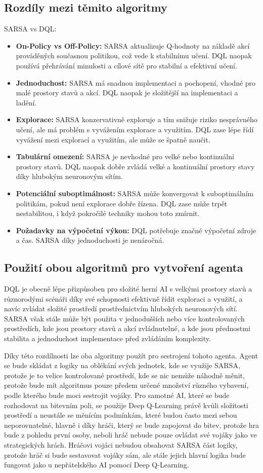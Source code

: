\subsection{Rozdíly mezi těmito algoritmy}
SARSA vs DQL:
\begin{itemize}
	\item \textbf{On-Policy vs Off-Policy:} SARSA aktualizuje Q-hodnoty na základě akcí prováděných současnou politikou, což vede k stabilnímu učení. DQL naopak používá přehrávání minulosti a cílové sítě pro stabilní a efektivní učení.
     \item \textbf{Jednoduchost:} SARSA má snadnou implementaci a pochopení, vhodné pro malé prostory stavů a akcí. DQL naopak je složitější na implementaci a ladění.
     \item \textbf{Explorace:} SARSA konzervativně exploruje a tím snižuje riziko nesprávného učení, ale má problém s vyvážením explorace a využitím. DQL zase lépe řídí vyvážení mezi explorací a využitím, ale může se špatně naučit.
     \item \textbf{Tabulární omezení:} SARSA je nevhodné pro velké nebo kontinuální prostory stavů. DQL naopak dobře zvládá velké a kontinuální prostory stavy díky hlubokým neuronovým sítím.
     \item \textbf{Potenciální suboptimálnost:} SARSA může konvergovat k suboptimálním politikám, pokud není explorace dobře řízena. DQL zase může trpět nestabilitou, i když pokročilé techniky mohou toto zmírnit.
     \item \textbf{Požadavky na výpočetní výkon:} DQL potřebuje značné výpočetní zdroje a čas. SARSA díky jednoduchosti je nenáročná.
\end{itemize}

\subsection{Použití obou algoritmů pro vytvoření agenta}
DQL je obecně lépe přizpůsoben pro složité herní AI s velkými prostory stavů a různorodými scénáři díky své schopnosti efektivně řídit exploraci a využití, a navíc zvládat složité prostředí prostřednictvím hlubokých neuronových sítí. SARSA však stále může být použita v jednodušších nebo více kontrolovaných prostředích, kde jsou prostory stavů a akcí zvládnutelné, a kde jsou přednostmi stabilita a jednoduchost implementace před zvládáním komplexity. 

Díky této rozdílnosti lze oba algoritmy použít pro sestrojení tohoto agenta. Agent se bude skládat z logiky na oblékání svých jednotek, kde se využije SARSA, protože je to velice kontrolované prostředí, kde se nic nemůže náhodně měnit, protože bude mít algoritmus pouze předem určené množství různého vybavení, podle kterého bude moci sestrojit vojáky. Pro samotné AI, které se bude rozhodovat na bitevním poli, se použije Deep Q-Learning právě kvůli složitosti prostředí a neustále se měnícím podmínkám, které budou často mezi sebou neporovnatelné, hlavně i díky hráči, který se bude zapojovat do bitev, protože hra bude z pohledu první osoby, neboli hráč nebude pouze ovládat své vojáky jako ve strategických hrách. Hráčovi vojáci nebudou obsahovat SARSA část logiky, protože hráč si bude sestavovat vojáky sám, ale stále jejich hlavní logika bude fungovat jako u nepřátelského AI pomocí Deep Q-Learning.